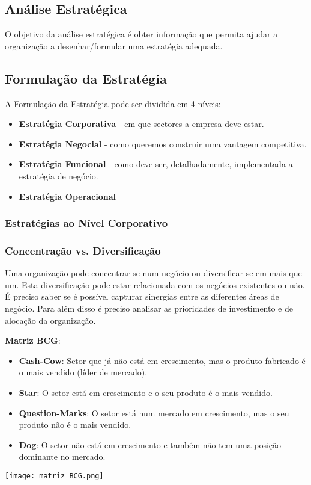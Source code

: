 \documentclass[11pt]{article}
\begin{document}
\subsection{Análise Estratégica}

O objetivo da análise estratégica é obter informação que permita ajudar a organização a desenhar/formular uma estratégia adequada.

\subsection{Formulação da Estratégia}

A Formulação da Estratégia pode ser dividida em 4 níveis:
\begin{itemize}[topsep=0pt]
    \item \textbf{Estratégia Corporativa} - em que sectores a empresa deve estar.
    \item \textbf{Estratégia Negocial} - como queremos construir uma vantagem competitiva.
    \item \textbf{Estratégia Funcional} - como deve ser, detalhadamente, implementada a  estratégia de negócio.
    \item \textbf{Estratégia Operacional}
\end{itemize}

\subsubsection{Estratégias ao Nível Corporativo}

\subsubsection*{Concentração vs. Diversificação}

Uma organização pode concentrar-se num negócio ou diversificar-se em mais que um. Esta diversificação pode estar relacionada com os negócios existentes ou não.
É preciso saber se é possível capturar sinergias entre as diferentes áreas de negócio.
Para além disso é preciso analisar as prioridades de investimento e de alocação da organização.

\begin{minipage}{0.5\textwidth}
    \textbf{Matriz BCG}:
    \begin{itemize}
        \item \textbf{Cash-Cow}: Setor que já não está em crescimento, mas o produto fabricado é o mais vendido (líder de mercado).
        \item \textbf{Star}: O setor está em crescimento e o seu produto é o mais vendido.
        \item \textbf{Question-Marks}: O setor está num mercado em crescimento, mas o seu produto não é o mais vendido.
        \item \textbf{Dog}: O setor não está em crescimento e também não tem uma posição dominante no mercado.
    \end{itemize}
\end{minipage}
\begin{minipage}{0.49\textwidth}
    \texttt{[image: matriz\_BCG.png]}
\end{minipage}
\end{document}

